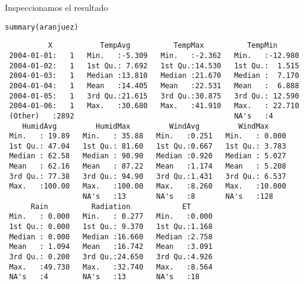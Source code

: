 \documentclass[xcolor={usenames,svgnames,dvipsnames}]{beamer}
\begin{document}
\begin{frame}[label={sec:orgc633398},fragile]{Inspeccionamos el resultado}
 \lstset{language=r,label= ,caption= ,captionpos=b,numbers=none}
\begin{lstlisting}
summary(aranjuez)
\end{lstlisting}

\begin{verbatim}
          X           TempAvg          TempMax          TempMin       
 2004-01-01:   1   Min.   :-5.309   Min.   :-2.362   Min.   :-12.980  
 2004-01-02:   1   1st Qu.: 7.692   1st Qu.:14.530   1st Qu.:  1.515  
 2004-01-03:   1   Median :13.810   Median :21.670   Median :  7.170  
 2004-01-04:   1   Mean   :14.405   Mean   :22.531   Mean   :  6.888  
 2004-01-05:   1   3rd Qu.:21.615   3rd Qu.:30.875   3rd Qu.: 12.590  
 2004-01-06:   1   Max.   :30.680   Max.   :41.910   Max.   : 22.710  
 (Other)   :2892                                     NA's   :4        
    HumidAvg         HumidMax         WindAvg         WindMax      
 Min.   : 19.89   Min.   : 35.88   Min.   :0.251   Min.   : 0.000  
 1st Qu.: 47.04   1st Qu.: 81.60   1st Qu.:0.667   1st Qu.: 3.783  
 Median : 62.58   Median : 90.90   Median :0.920   Median : 5.027  
 Mean   : 62.16   Mean   : 87.22   Mean   :1.174   Mean   : 5.208  
 3rd Qu.: 77.38   3rd Qu.: 94.90   3rd Qu.:1.431   3rd Qu.: 6.537  
 Max.   :100.00   Max.   :100.00   Max.   :8.260   Max.   :10.000  
                  NA's   :13       NA's   :8       NA's   :128     
      Rain          Radiation            ET       
 Min.   : 0.000   Min.   : 0.277   Min.   :0.000  
 1st Qu.: 0.000   1st Qu.: 9.370   1st Qu.:1.168  
 Median : 0.000   Median :16.660   Median :2.758  
 Mean   : 1.094   Mean   :16.742   Mean   :3.091  
 3rd Qu.: 0.200   3rd Qu.:24.650   3rd Qu.:4.926  
 Max.   :49.730   Max.   :32.740   Max.   :8.564  
 NA's   :4        NA's   :13       NA's   :18
\end{verbatim}
\end{frame}
\end{document}
